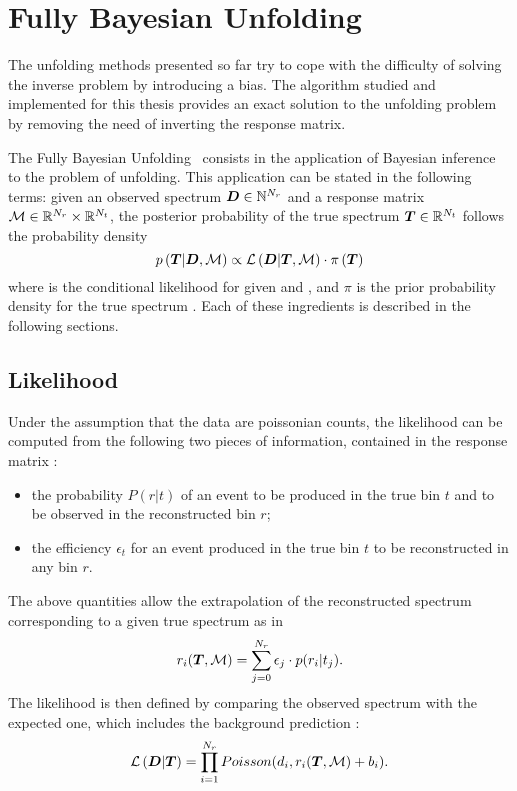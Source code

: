 \section{Fully Bayesian Unfolding}
\label{sec:fbu}
The unfolding methods presented so far try to cope with the difficulty
of solving the inverse problem by introducing a bias. The algorithm
studied and implemented for this thesis provides an exact solution to
the unfolding problem by removing the need of inverting the response
matrix.

The Fully Bayesian Unfolding~\cite{fbu} consists in the application of
Bayesian inference to the problem of unfolding. This application can
be stated in the following terms: given an observed spectrum
$\boldsymbol{D}\in\mathbb{N}^{N_r}$ and a response matrix
$\mathcal{M}\in\mathbb{R}{}^{N_r}\times{}\mathbb{R}{}^{N_t}$, the posterior
probability of the true spectrum $\boldsymbol{T}{}\in{}\mathbb{R}{}^{N_t}$ follows
the probability density
\begin{equation}
p\left(\boldsymbol{T}{}|\boldsymbol{D}{},\mathcal{M}{}\right)
\propto{}
\mathcal{L}\left(\boldsymbol{D}{}|\boldsymbol{T}{},\mathcal{M}{}\right)
\cdot{}
\pi{}\left(\boldsymbol{T}{}\right)
\end{equation}
where \conditionalLhood{\Data{}}{\Truth{},\TrasfMatrix{}} is the
conditional likelihood for \Data{} given \Truth{} and \TrasfMatrix{},
and $\pi{}$ is the prior probability density for the true spectrum
\Truth{}.
Each of these ingredients is described in the following sections.

\subsection{Likelihood}
\label{sec:fbullhood}
Under the assumption that the data are poissonian counts, the
likelihood \conditionalLhood{\Data{}}{\Truth{},\TrasfMatrix{}} can be
computed from the following two pieces of information, contained in
the response matrix \TrasfMatrix{}:
\begin{itemize}
\item the probability $P(r|t)$ of an event to be
  produced in the true bin $t$ and to be observed in the reconstructed
  bin $r$;
\item the efficiency $\epsilon{}_t$ for an event produced in the
  true bin $t$ to be reconstructed in any bin $r$.
\end{itemize}
The above quantities allow the extrapolation of the reconstructed spectrum
\Reco{} corresponding to a given true spectrum \Truth{} as in
\begin{equation}
r_i(\boldsymbol{T}{},\mathcal{M}{}) = \sum_{j=0}^{N_r}\epsilon_j\cdot{}p(r_i|t_j).
\end{equation}
The likelihood is then defined by comparing the observed spectrum
\Data{} with the expected one, which includes the background
prediction \Bckg{}:
\begin{equation}
\mathcal{L}\left(\boldsymbol{D}{}|\boldsymbol{T}{}\right) =
\prod_{i=1}^{N_r}Poisson(d_i,r_i(\boldsymbol{T}{},\mathcal{M}{})+b_i).
\end{equation}

